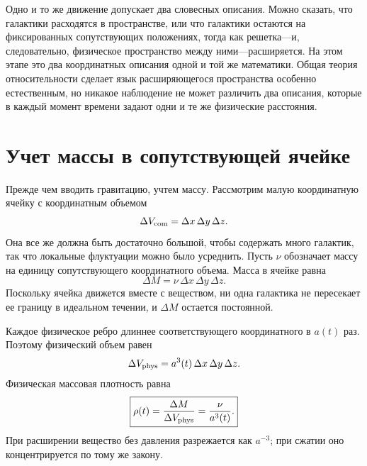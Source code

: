 \begin{classroomqa}
\end{classroomqa}

Одно и то же движение допускает два словесных описания. Можно сказать, что галактики расходятся в пространстве, или что галактики остаются на фиксированных сопутствующих положениях, тогда как решетка---и, следовательно, физическое пространство между ними---расширяется. На этом этапе это два координатных описания одной и той же математики. Общая теория относительности сделает язык расширяющегося пространства особенно естественным, но никакое наблюдение не может различить два описания, которые в каждый момент времени задают одни и те же физические расстояния.

\section{Учет массы в сопутствующей ячейке}

Прежде чем вводить гравитацию, учтем массу. Рассмотрим малую координатную ячейку с координатным объемом
\begin{equation}
\Delta V_{\rm com}=\Delta x\,\Delta y\,\Delta z.
\end{equation}
Она все же должна быть достаточно большой, чтобы содержать много галактик, так что локальные флуктуации можно было усреднить. Пусть \(\nu\) обозначает массу на единицу сопутствующего координатного объема. Масса в ячейке равна
\begin{equation}
\Delta M=\nu\,\Delta x\,\Delta y\,\Delta z.
\label{eq:c01-comoving-mass}
\end{equation}
Поскольку ячейка движется вместе с веществом, ни одна галактика не пересекает ее границу в идеальном течении, и \(\Delta M\) остается постоянной.

Каждое физическое ребро длиннее соответствующего координатного в \(a(t)\) раз. Поэтому физический объем равен
\begin{equation}
\Delta V_{\rm phys}=a^3(t)\,\Delta x\,\Delta y\,\Delta z.
\end{equation}
Физическая массовая плотность равна
\begin{equation}
\boxed{\rho(t)=\frac{\Delta M}{\Delta V_{\rm phys}}=\frac{\nu}{a^3(t)}.}
\label{eq:c01-density-dilution}
\end{equation}
При расширении вещество без давления разрежается как \(a^{-3}\); при сжатии оно концентрируется по тому же закону.

